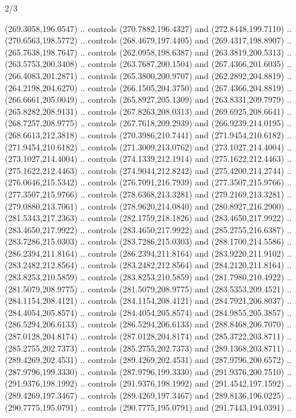 \begin{flagdescription}{2/3}
\begin{scope}[xshift=0.5\flaglength,yshift=0.5\flagwidth,scale=\flagwidth/318.91]
\begin{scope}[y=0.8pt, x=0.8pt, yscale=-1,shift={(-298.97,-199.32)}]
  (269.3058,196.0547) .. controls (270.7882,196.4327) and (272.8448,199.7110) ..
  (270.6563,198.5772) .. controls (268.4679,197.4405) and (269.4317,198.8907) ..
  (265.7638,198.7647) .. controls (262.0958,198.6387) and (263.3819,200.5313) ..
  (263.5753,200.3408) .. controls (263.7687,200.1504) and (267.4366,201.6035) ..
  (266.4083,201.2871) .. controls (265.3800,200.9707) and (262.2892,204.8819) ..
  (264.2198,204.6270) .. controls (266.1505,204.3750) and (267.4366,204.8819) ..
  (266.6661,205.0049) .. controls (265.8927,205.1309) and (263.8331,209.7979) ..
  (265.8282,208.9131) .. controls (267.8263,208.0313) and (269.6925,208.6641) ..
  (268.7257,208.9775) .. controls (267.7618,209.2939) and (266.9239,214.0195) ..
  (268.6613,212.3818) .. controls (270.3986,210.7441) and (271.9454,210.6182) ..
  (271.9454,210.6182) .. controls (271.3009,213.0762) and (273.1027,214.4004) ..
  (273.1027,214.4004) .. controls (274.1339,212.1914) and (275.1622,212.4463) ..
  (275.1622,212.4463) .. controls (274.9044,212.8242) and (275.4200,214.2744) ..
  (276.0646,215.5342) .. controls (276.7091,216.7939) and (277.3507,215.9766) ..
  (277.3507,215.9766) .. controls (278.6368,213.3281) and (279.2169,213.3281) ..
  (279.0880,213.7061) .. controls (278.9620,214.0840) and (280.8927,216.2900) ..
  (281.5343,217.2363) .. controls (282.1759,218.1826) and (283.4650,217.9922) ..
  (283.4650,217.9922) .. controls (283.4650,217.9922) and (285.2755,216.6387) ..
  (283.7286,215.0303) .. controls (283.7286,215.0303) and (288.1700,214.5586) ..
  (286.2394,211.8164) .. controls (286.2394,211.8164) and (283.9220,211.9102) ..
  (283.2482,212.8564) .. controls (283.2482,212.8564) and (284.2120,211.8164) ..
  (283.8253,210.5859) .. controls (283.8253,210.5859) and (281.7980,210.4922) ..
  (281.5079,208.9775) .. controls (281.5079,208.9775) and (283.5353,209.4521) ..
  (284.1154,208.4121) .. controls (284.1154,208.4121) and (284.7921,206.8037) ..
  (284.4054,205.8574) .. controls (284.4054,205.8574) and (284.9855,205.3857) ..
  (286.5294,206.6133) .. controls (286.5294,206.6133) and (288.8468,206.7070) ..
  (287.0128,204.8174) .. controls (287.0128,204.8174) and (285.3722,203.8711) ..
  (285.2755,202.7373) .. controls (285.2755,202.7373) and (289.1368,203.8711) ..
  (289.4269,202.4531) .. controls (289.4269,202.4531) and (287.9796,200.6572) ..
  (287.9796,199.3330) .. controls (287.9796,199.3330) and (291.9376,200.7510) ..
  (291.9376,198.1992) .. controls (291.9376,198.1992) and (291.4542,197.1592) ..
  (289.4269,197.3467) .. controls (289.4269,197.3467) and (289.8136,196.0225) ..
  (290.7775,195.0791) .. controls (290.7775,195.0791) and (291.7443,194.0391) ..

\end{scope}
\end{scope}
\end{flagdescription}
